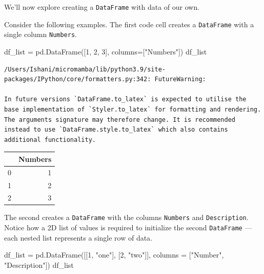 \documentclass[
  letterpaper,
  DIV=11,
  numbers=noendperiod]{scrreprt}
\newenvironment{Shaded}{\begin{snugshade}}{\end{snugshade}}
\newcommand{\DecValTok}[1]{\textcolor[rgb]{0.68,0.00,0.00}{#1}}
\newcommand{\NormalTok}[1]{\textcolor[rgb]{0.00,0.23,0.31}{#1}}
\newcommand{\OperatorTok}[1]{\textcolor[rgb]{0.37,0.37,0.37}{#1}}
\newcommand{\StringTok}[1]{\textcolor[rgb]{0.13,0.47,0.30}{#1}}
\begin{document}
We'll now explore creating a \texttt{DataFrame} with data of our own.

Consider the following examples. The first code cell creates a
\texttt{DataFrame} with a single column \texttt{Numbers}.

\begin{Shaded}
\begin{Highlighting}[]
\NormalTok{df\_list }\OperatorTok{=}\NormalTok{ pd.DataFrame([}\DecValTok{1}\NormalTok{, }\DecValTok{2}\NormalTok{, }\DecValTok{3}\NormalTok{], columns}\OperatorTok{=}\NormalTok{[}\StringTok{"Numbers"}\NormalTok{])}
\NormalTok{df\_list}
\end{Highlighting}
\end{Shaded}

\begin{verbatim}
/Users/Ishani/micromamba/lib/python3.9/site-packages/IPython/core/formatters.py:342: FutureWarning:

In future versions `DataFrame.to_latex` is expected to utilise the base implementation of `Styler.to_latex` for formatting and rendering. The arguments signature may therefore change. It is recommended instead to use `DataFrame.style.to_latex` which also contains additional functionality.
\end{verbatim}

\begin{tabular}{lr}
\toprule
{} &  Numbers \\
\midrule
0 &        1 \\
1 &        2 \\
2 &        3 \\
\bottomrule
\end{tabular}

The second creates a \texttt{DataFrame} with the columns
\texttt{Numbers} and \texttt{Description}. Notice how a 2D list of
values is required to initialize the second \texttt{DataFrame} --- each
nested list represents a single row of data.

\begin{Shaded}
\begin{Highlighting}[]
\NormalTok{df\_list }\OperatorTok{=}\NormalTok{ pd.DataFrame([[}\DecValTok{1}\NormalTok{, }\StringTok{"one"}\NormalTok{], [}\DecValTok{2}\NormalTok{, }\StringTok{"two"}\NormalTok{]], columns }\OperatorTok{=}\NormalTok{ [}\StringTok{"Number"}\NormalTok{, }\StringTok{"Description"}\NormalTok{])}
\NormalTok{df\_list}
\end{Highlighting}
\end{Shaded}
\end{document}
